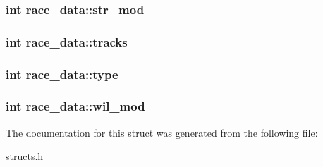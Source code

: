 \hypertarget{structrace__data_ad535626e5de740a3eadb9abf3b76699b}{
\subsubsection[{str\-\_\-mod}]{\setlength{\rightskip}{0pt plus 5cm}int race\-\_\-data\-::str\-\_\-mod}}\label{structrace__data_ad535626e5de740a3eadb9abf3b76699b}
\hypertarget{structrace__data_a382710ad25338369b82bfc462645dadc}{
\subsubsection[{tracks}]{\setlength{\rightskip}{0pt plus 5cm}int race\-\_\-data\-::tracks}}\label{structrace__data_a382710ad25338369b82bfc462645dadc}
\hypertarget{structrace__data_a379b96a5156ce510e1f4e293714e6841}{
\subsubsection[{type}]{\setlength{\rightskip}{0pt plus 5cm}int race\-\_\-data\-::type}}\label{structrace__data_a379b96a5156ce510e1f4e293714e6841}
\hypertarget{structrace__data_a56763a2631d10d3eb1e12aced61e43ec}{
\subsubsection[{wil\-\_\-mod}]{\setlength{\rightskip}{0pt plus 5cm}int race\-\_\-data\-::wil\-\_\-mod}}\label{structrace__data_a56763a2631d10d3eb1e12aced61e43ec}


The documentation for this struct was generated from the following file\-:\begin{DoxyCompactItemize}
\item 
\hyperlink{structs_8h}{structs.\-h}\end{DoxyCompactItemize}
